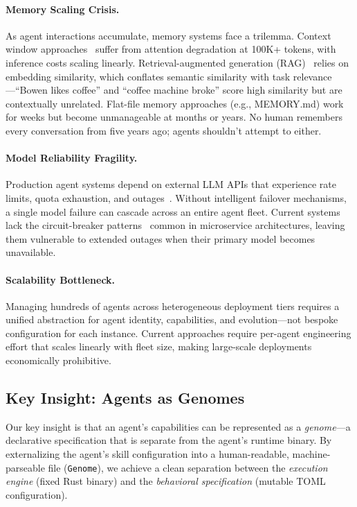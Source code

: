 \documentclass{article}
\newcommand{\genome}{\texttt{Genome}\xspace}
\begin{document}
\paragraph{Memory Scaling Crisis.} As agent interactions accumulate, memory systems face a trilemma. Context window approaches~\cite{xiong2023memorizing} suffer from attention degradation at 100K+ tokens, with inference costs scaling linearly. Retrieval-augmented generation (RAG)~\cite{lewis2020retrieval} relies on embedding similarity, which conflates semantic similarity with task relevance—``Bowen likes coffee'' and ``coffee machine broke'' score high similarity but are contextually unrelated. Flat-file memory approaches (e.g., MEMORY.md) work for weeks but become unmanageable at months or years. No human remembers every conversation from five years ago; agents shouldn't attempt to either.

\paragraph{Model Reliability Fragility.} Production agent systems depend on external LLM APIs that experience rate limits, quota exhaustion, and outages~\cite{tan2020head}. Without intelligent failover mechanisms, a single model failure can cascade across an entire agent fleet. Current systems lack the circuit-breaker patterns~\cite{ford2000circuit} common in microservice architectures, leaving them vulnerable to extended outages when their primary model becomes unavailable.

\paragraph{Scalability Bottleneck.} Managing hundreds of agents across heterogeneous deployment tiers requires a unified abstraction for agent identity, capabilities, and evolution—not bespoke configuration for each instance. Current approaches require per-agent engineering effort that scales linearly with fleet size, making large-scale deployments economically prohibitive.

\subsection{Key Insight: Agents as Genomes}

Our key insight is that an agent's capabilities can be represented as a \textit{genome}—a declarative specification that is separate from the agent's runtime binary. By externalizing the agent's skill configuration into a human-readable, machine-parseable file (\genome{}), we achieve a clean separation between the \textit{execution engine} (fixed Rust binary) and the \textit{behavioral specification} (mutable TOML configuration).
\end{document}
